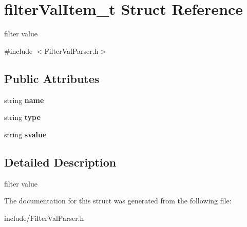 \hypertarget{structfilterValItem__t}{}\section{filter\+Val\+Item\+\_\+t Struct Reference}
\label{structfilterValItem__t}


filter value  




{\ttfamily \#include $<$Filter\+Val\+Parser.\+h$>$}

\subsection*{Public Attributes}
\begin{DoxyCompactItemize}
\item 
\mbox{\label{structfilterValItem__t_a89b779fa37fbf6ef52c28c37066ad5c9}} 
string {\bfseries name}
\item 
\mbox{\label{structfilterValItem__t_a8ce4cc79957542c0de56856c29672679}} 
string {\bfseries type}
\item 
\mbox{\label{structfilterValItem__t_aba15c2104fa75c13c6bd63d4611a6486}} 
string {\bfseries svalue}
\end{DoxyCompactItemize}


\subsection{Detailed Description}
filter value 

The documentation for this struct was generated from the following file\+:\begin{DoxyCompactItemize}
\item 
include/Filter\+Val\+Parser.\+h\end{DoxyCompactItemize}
